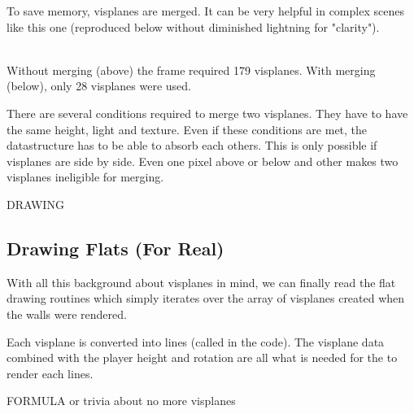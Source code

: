 To save memory, visplanes are merged. It can be very helpful in complex scenes like this one (reproduced below without diminished lightning for "clarity").\\



\\
Without merging (above) the frame required 179 visplanes. With merging (below), only 28 visplanes were used.\\ 



There are several conditions required to merge two visplanes. They have to have the same height, light and texture. Even if these conditions are met, the datastructure has to be able to absorb each others. This is only possible if visplanes are side by side. Even one pixel above or below and other makes two visplanes ineligible for merging.\\
\par
{}
\par
DRAWING\\
\vspace{4cm}
\par

\subsection{Drawing Flats (For Real)}

With all this background about visplanes in mind, we can finally read the flat drawing routines which simply iterates over the array of visplanes created when the walls were rendered.\\
\par
Each visplane is converted into lines (called  in the code). The visplane data combined with the player height and rotation are all what is needed for the  to render each lines.\\
\par
{}
\par
FORMULA or trivia about no more visplanes\\
\vspace{4cm}
\par


